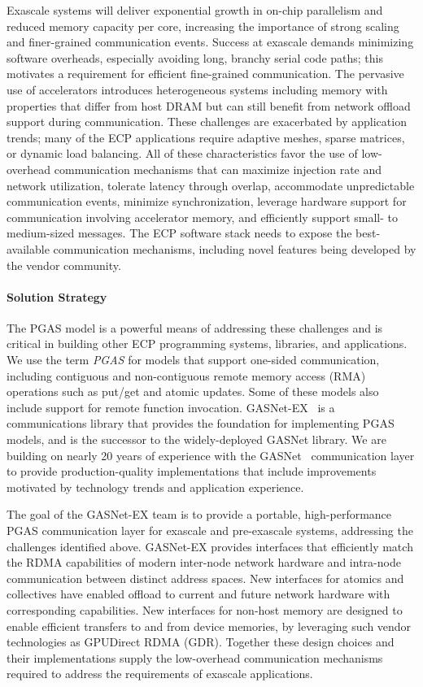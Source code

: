 Exascale systems will deliver exponential growth in on-chip parallelism and
reduced memory capacity per core, 
increasing the importance of strong
scaling and finer-grained communication events.  
Success at exascale demands minimizing software overheads,
especially avoiding long, branchy serial code paths; 
this motivates a requirement for efficient
fine-grained communication.
The pervasive use of accelerators introduces heterogeneous systems including
memory with properties that differ from host DRAM but can still benefit from
network offload support during communication.
These challenges are exacerbated by application trends; many of the ECP applications require
adaptive meshes, sparse matrices,
or dynamic load balancing.
All of these characteristics favor the use of
low-overhead communication mechanisms that
can maximize injection rate and network utilization, tolerate latency through
overlap, accommodate unpredictable communication events, minimize synchronization,
leverage hardware support for communication involving accelerator memory,
and efficiently support small- to medium-sized messages. The ECP software stack
needs to expose the best-available communication mechanisms, including novel
features being developed by the vendor community.

\paragraph{Solution Strategy}

The PGAS model is a powerful means of addressing these
challenges and is critical in building other ECP programming systems,
libraries, and applications.  We use the term {\em PGAS} for models that support
one-sided communication, 
including contiguous and non-contiguous remote memory access (RMA) operations such as put/get
and atomic updates. Some of these models also include support for remote function invocation.
GASNet-EX~\cite{gasnet-lcpc18} is a communications library that provides the foundation for implementing
PGAS models, and is the successor to the widely-deployed GASNet library.
We are building on nearly 20 years of experience with the GASNet~\cite{gasnet-site,gasnet-spec}
communication layer to provide production-quality implementations that include
improvements motivated by
technology trends and application experience.  

The goal of the GASNet-EX team is to provide a portable, high-performance PGAS
communication layer for exascale and pre-exascale systems, addressing the challenges
identified above.
GASNet-EX provides interfaces that efficiently match the RDMA capabilities of modern
inter-node network hardware and intra-node communication between distinct address spaces.
New interfaces for atomics and collectives have enabled offload to current
and future network hardware with corresponding capabilities.
New interfaces for non-host memory are designed to enable efficient transfers
to and from device memories, by leveraging such vendor technologies as
GPUDirect RDMA (GDR).
Together these design choices and their implementations supply the low-overhead communication
mechanisms required to address the requirements of exascale applications.

